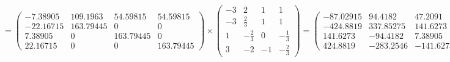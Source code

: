 \documentclass{article}
\begin{document}
$$= \begin{pmatrix}
-7.38905 & 109.1963 & 54.59815 & 54.59815 \\
-22.16715 & 163.79445 & 0 & 0 \\
7.38905 & 0 & 163.79445 & 0 \\
22.16715 & 0 & 0 & 163.79445
\end{pmatrix} \times \begin{pmatrix}
-3 & 2 & 1 & 1 \\
-3 & \frac{2}{3} & 1 & 1 \\
1 & -\frac{2}{3} & 0 & -\frac{1}{3} \\
3 & -2 & -1 & -\frac{2}{3}
\end{pmatrix} = \begin{pmatrix}
-87.02915 & 94.4182 & 47.2091 & 47.2091 \\
-424.8819 & 337.85275 & 141.6273 & 141.6273 \\
141.6273 & -94.4182 & 7.38905 & -47.2091 \\
424.8819 & -283.2546 & -141.6273 & -87.02915
\end{pmatrix}$$
\end{document}
